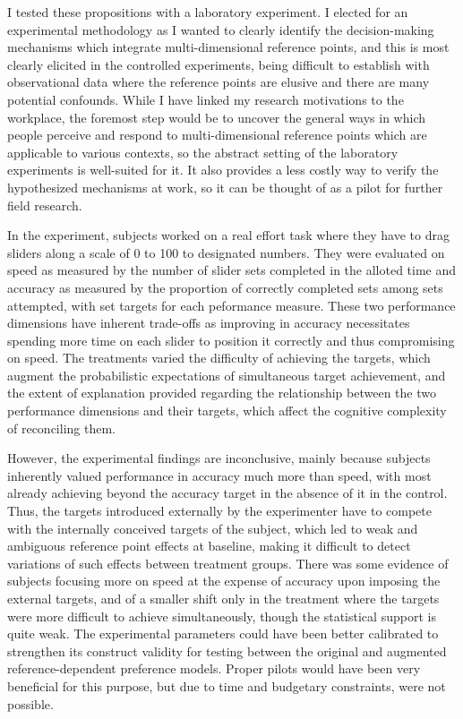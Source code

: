\documentclass[12pt, letterpaper]{article}
\begin{document}
I tested these propositions with a laboratory experiment. I elected for an experimental methodology as I wanted to clearly identify the decision-making mechanisms which integrate multi-dimensional reference points, and this is most clearly elicited in the controlled experiments, being difficult to establish with observational data where the reference points are elusive and there are many potential confounds. While I have linked my research motivations to the workplace, the foremost step would be to uncover the general ways in which people perceive and respond to multi-dimensional reference points which are applicable to various contexts, so the abstract setting of the laboratory experiments is well-suited for it. It also provides a less costly way to verify the hypothesized mechanisms at work, so it can be thought of as a pilot for further field research.

In the experiment, subjects worked on a real effort task where they have to drag sliders along a scale of 0 to 100 to designated numbers. They were evaluated on speed as measured by the number of slider sets completed in the alloted time and accuracy as measured by the proportion of correctly completed sets among sets attempted, with set targets for each peformance measure. These two performance dimensions have inherent trade-offs as improving in accuracy necessitates spending more time on each slider to position it correctly and thus compromising on speed. The treatments varied the difficulty of achieving the targets, which augment the probabilistic expectations of simultaneous target achievement, and the extent of explanation provided regarding the relationship between the two performance dimensions and their targets, which affect the cognitive complexity of reconciling them.

However, the experimental findings are inconclusive, mainly because subjects inherently valued performance in accuracy much more than speed, with most already achieving beyond the accuracy target in the absence of it in the control. Thus, the targets introduced externally by the experimenter have to compete with the internally conceived targets of the subject, which led to weak and ambiguous reference point effects at baseline, making it difficult to detect variations of such effects between treatment groups. There was some evidence of subjects focusing more on speed at the expense of accuracy upon imposing the external targets, and of a smaller shift only in the treatment where the targets were more difficult to achieve simultaneously, though the statistical support is quite weak. The experimental parameters could have been better calibrated to strengthen its construct validity for testing between the original and augmented reference-dependent preference models. Proper pilots would have been very beneficial for this purpose, but due to time and budgetary constraints, were not possible.
\end{document}

